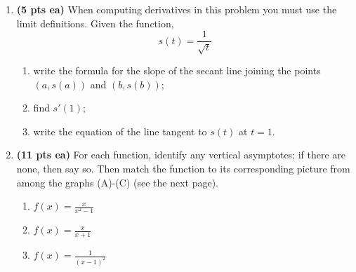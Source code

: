 \documentclass[12pt]{article}
\begin{document}
\begin{enumerate}
\newpage
\item {\bf (5 pts ea)} When computing derivatives in this problem you must use the limit definitions.  Given the function,
\[s(t)=\frac{1}{\sqrt{t}}\]
	\begin{enumerate}
	\item write the formula for the slope of the secant line joining the points $(a,s(a))$ and $(b,s(b))$;
	\vspace{14pc}
	
	\item find $s'(1)$;
	\vspace{14pc}
	
	\item write the equation of the line tangent to $s(t)$ at $t=1$.
	\end{enumerate}
	
\newpage
\item {\bf (11 pts ea)} For each function, identify any vertical asymptotes; if there are none, then say so.  Then match the function to its corresponding picture from among the graphs (A)-(C) (see the next page).  
\begin{enumerate}

	\item $f(x)=\frac{x}{x^2-1}$
	\vspace{14pc}
	
	\item $f(x)=\frac{x}{x+1}$
	\vspace{15pc}
	
	\item $f(x)=\frac{1}{(x-1)^2}$
	\vspace{15pc}
\end{enumerate}	
\newpage
\begin{enumerate}[(A)]\centering

\end{enumerate}
\end{enumerate}
\end{document}
